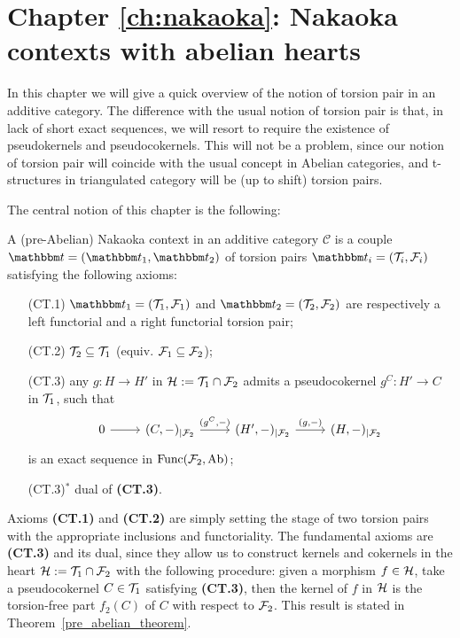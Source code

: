 \section*{Chapter \ref{ch:nakaoka}: Nakaoka contexts with abelian hearts}

In this chapter we will give a quick overview of the notion of torsion pair in an additive category. The difference with the usual notion of torsion pair is that, in lack of short exact sequences, we will resort to require the existence of pseudokernels and pseudocokernels. This will not be a problem, since our notion of torsion pair will coincide with the usual concept in Abelian categories, and t-structures in triangulated category will be (up to shift) torsion pairs.

The central notion of this chapter is the following:
\begin{nonlisting_def}
A (pre-Abelian) Nakaoka context in an additive category $\mathscr{C}$ is a couple $\t=(\t_1,\t_2)$ of torsion pairs $\t_i=(\T_i,\F_i)$ satisfying the following axioms:

\begin{enumerate}
  \item[(CT.1)] $\t_1=(\T_1,\F_1)$ and $\t_2=(\T_2,\F_2)$ are respectively a left functorial and a right functorial torsion pair;
  \item[(CT.2)] $\mathcal{T}_2\subseteq \mathcal{T}_1$ (equiv. $\mathcal{F}_1\subseteq\mathcal{F}_2$);
  \item[(CT.3)] any  $g\colon H\to H'$ in $\mathcal{H}:=\mathcal{T}_1\cap\mathcal{F}_2$ admits a pseudocokernel $g^C\colon H'\to C$ in $\mathcal{T}_1$, such that
    \begin{equation*}
      \begin{tikzcd}
        0\arrow{r} &(C,-)_{|\F_2}\arrow{r}{(g^C,-)} & (H',-)_{|\F_2}\arrow{r}{(g,-)}& (H,-)_{|\F_2}
      \end{tikzcd}
    \end{equation*}
    is an exact sequence in $\mathrm{Func}(\mathcal{F}_2,\mathrm{Ab})$;
  \item[(CT.3)$^\ast$] dual of \textbf{(CT.3)}.
\end{enumerate}
\end{nonlisting_def}

Axioms \textbf{(CT.1)} and \textbf{(CT.2)} are simply setting the stage of two torsion pairs with the appropriate inclusions and functoriality. The fundamental axioms are \textbf{(CT.3)} and its dual, since they allow us to construct kernels and cokernels in the heart $\mathcal{H}:=\mathcal{T}_1\cap\mathcal{F}_2$ with the following procedure: given a morphism $f\in\mathcal{H}$, take a pseudocokernel $C\in\mathcal{T}_1$ satisfying \textbf{(CT.3)}, then the kernel of $f$ in $\mathcal{H}$ is the torsion-free part $f_2(C)$ of $C$ with respect to $\mathcal{F}_2$. This result is stated in Theorem~\ref{pre_abelian_theorem}.

